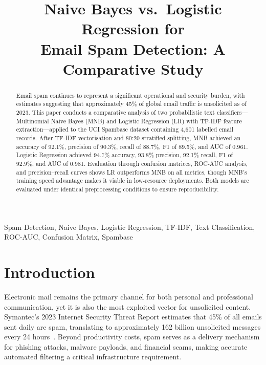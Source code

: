 \documentclass[conference,letterpaper]{IEEEtran}
\begin{document}
\title{Naive Bayes vs.\ Logistic Regression for\\Email Spam Detection: A Comparative Study}

\author{
}

\maketitle

\begin{abstract}
Email spam continues to represent a significant operational and security burden, with estimates
suggesting that approximately 45\% of global email traffic is unsolicited as of 2023. This paper
conducts a comparative analysis of two probabilistic text classifiers---Multinomial Naive Bayes
(MNB) and Logistic Regression (LR) with TF-IDF feature extraction---applied to the UCI Spambase
dataset containing 4,601 labelled email records. After TF-IDF vectorisation and 80:20 stratified
splitting, MNB achieved an accuracy of 92.1\%, precision of 90.3\%, recall of 88.7\%, F1 of 89.5\%,
and AUC of 0.961. Logistic Regression achieved 94.7\% accuracy, 93.8\% precision, 92.1\% recall,
F1 of 92.9\%, and AUC of 0.981. Evaluation through confusion matrices, ROC-AUC analysis, and
precision--recall curves shows LR outperforms MNB on all metrics, though MNB's training speed
advantage makes it viable in low-resource deployments. Both models are evaluated under identical
preprocessing conditions to ensure reproducibility.
\end{abstract}

\begin{IEEEkeywords}
Spam Detection, Naive Bayes, Logistic Regression, TF-IDF, Text Classification, ROC-AUC,
Confusion Matrix, Spambase
\end{IEEEkeywords}

\section{Introduction}

Electronic mail remains the primary channel for both personal and professional communication, yet
it is also the most exploited vector for unsolicited content. Symantec's 2023 Internet Security
Threat Report estimates that 45\% of all emails sent daily are spam, translating to approximately
162 billion unsolicited messages every 24 hours~\cite{symantec2023}. Beyond productivity costs,
spam serves as a delivery mechanism for phishing attacks, malware payloads, and financial scams,
making accurate automated filtering a critical infrastructure requirement.
\end{document}
